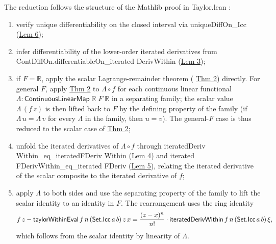 \documentclass[11pt,reqno]{amsart}
\begin{document}
\noindent The reduction follows the structure of the Mathlib proof in 
\textsf{Taylor.lean} \cite{mathlib4-taylor}:

\begin{enumerate}
\item verify unique differentiability on the closed interval via \textsf{%
unique\allowbreak Diff\allowbreak On\allowbreak\_Icc} (\hyperlink{lem:uniqueIcc}%
{Lem 6});

\item infer differentiability of the lower-order iterated derivatives from 
\textsf{ContDiffOn.differentiableOn\allowbreak\_iterated\allowbreak
Deriv\allowbreak Within} (\hyperlink{lem:diffiter}{Lem 3});

\item if $F=\mathbb{R}$, apply the scalar Lagrange-remainder theorem ( 
\hyperlink{thm:scalar}{Thm 2}) directly. For general $F$, apply \hyperlink{thm:scalar}%
{Thm 2} to $\Lambda\circ f$ for each continuous linear functional $\Lambda:%
\mathsf{ContinuousLinearMap}\;\mathbb{R}\;F\;\mathbb{R}$ in a separating
family; the scalar value $\Lambda\,(f\,z)$ is then lifted back to $F$ by the
defining property of the family (if $\Lambda\,u=\Lambda\,v$ for every $%
\Lambda$ in the family, then $u=v$). The general-$F$ case is thus reduced to
the scalar case of \hyperlink{thm:scalar}{Thm 2};

\item unfold the iterated derivatives of $\Lambda\circ f$ through \textsf{%
iterated\allowbreak Deriv\allowbreak
Within\allowbreak\_eq\allowbreak\_iterated\allowbreak FDeriv\allowbreak
Within} (\hyperlink{lem:iterFD}{Lem 4}) and \textsf{iterated\allowbreak
FDeriv\allowbreak Within\allowbreak\_eq\allowbreak\_iterated\allowbreak
FDeriv} (\hyperlink{lem:iterFDUniv}{Lem 5}), relating the iterated
derivative of the scalar composite to the iterated derivative of $f$;

\item apply $\Lambda$ to both sides and use the separating property of the
family to lift the scalar identity to an identity in $F$. The rearrangement
uses the ring identity 
\begin{equation}  \label{eq:combined}
f\,z-\mathsf{taylorWithinEval}\,f\,n\,(\mathsf{Set.Icc}\,a\,b)\,z\,x = \frac{%
(z-x)^{n}}{n!}\cdot\mathsf{iteratedDerivWithin}\,f\,n\,(\mathsf{Set.Icc}%
\,a\,b)\,\xi ,
\end{equation}
which follows from the scalar identity by linearity of $\Lambda$.
\end{enumerate}
\end{document}
